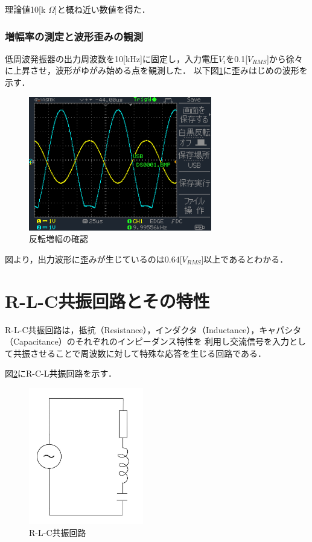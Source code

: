 \documentclass[dvipdfmx,titlepage,a4j]{jsarticle}  %
\numberwithin{equation}{section}
\begin{document}
理論値10[k $\Omega$]と概ね近い数値を得た．

\subsubsection{増幅率の測定と波形歪みの観測}
低周波発振器の出力周波数を10[kHz]に固定し，入力電圧$V_i$を0.1[$V_{RMS}$]から徐々に上昇させ，波形がゆがみ始める点を観測した．
以下図\ref{fig:DS0001.BMP}に歪みはじめの波形を示す．

\begin{figure}[H]
  \centering
  \includegraphics[width=8cm]{../oscilloscope/DS0001.BMP}
  \caption{反転増幅の確認}
  \label{fig:DS0001.BMP}
\end{figure}

図より，出力波形に歪みが生じているのは0.64[$V_{RMS}$]以上であるとわかる．

\section{R-L-C共振回路とその特性}
R-L-C共振回路は，抵抗（Resistance），インダクタ（Inductance），キャパシタ（Capacitance）のそれぞれのインピーダンス特性を
利用し交流信号を入力として共振させることで周波数に対して特殊な応答を生じる回路である．

図\ref{fig:fig6-rcl.jpg}にR-C-L共振回路を示す．
\begin{figure}[H]
  \centering
  \includegraphics[width=5cm]{../fig/fig6-rcl.jpg}
  \caption{R-L-C共振回路}
  \label{fig:fig6-rcl.jpg}
\end{figure}
\end{document}
